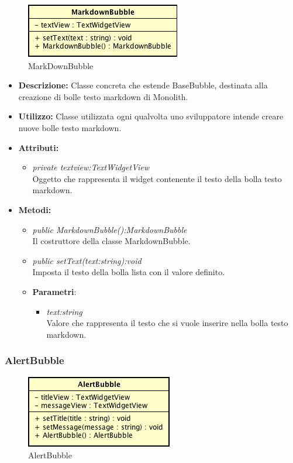 \label{MarkdownBubble}
\begin{figure}[ht]
	\centering
	\includegraphics[scale=0.5]{Sezioni/SottosezioniST/img/MarkdownBubble.png}
	\caption{MarkDownBubble}
\end{figure}

\begin{itemize}
\item \textbf{Descrizione:} Classe concreta che estende BaseBubble, destinata alla creazione di bolle testo markdown di Monolith.
\item \textbf{Utilizzo:} Classe utilizzata ogni qualvolta uno sviluppatore intende creare nuove bolle testo markdown.
\item \textbf{Attributi:}
\begin{itemize}
\item \textit{private textview:TextWidgetView}\\
Oggetto che rappresenta il widget contenente il testo della bolla testo markdown.
\end{itemize}
\item \textbf{Metodi:}
\begin{itemize}
\item \textit{public MarkdownBubble():MarkdownBubble}\\
Il costruttore della classe MarkdownBubble.
\item \textit{public setText(text:string):void}\\
Imposta il testo della bolla lista con il valore definito.
\item{\textbf{Parametri}: \begin{itemize}
\item \textit{text:string}\\
Valore che rappresenta il testo che si vuole inserire nella bolla testo markdown.
\end{itemize}}
\end{itemize}
\end{itemize}

\subsubsection{AlertBubble}

\label{AlertBubble}
\begin{figure}[ht]
	\centering
	\includegraphics[scale=0.5]{Sezioni/SottosezioniST/img/AlertBubble.png}
	\caption{AlertBubble}
\end{figure}

